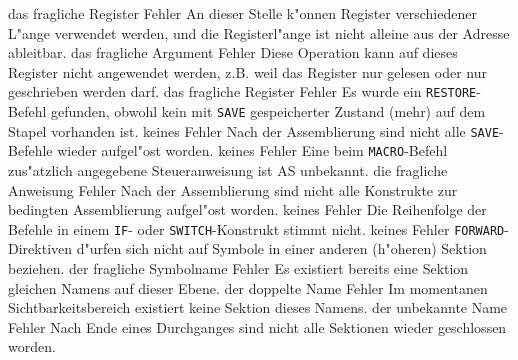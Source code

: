 \documentclass[12pt,a4paper,twoside]{report}
\newcommand{\tty}[1]{{\tt #1}}
\newcommand{\asname}{AS}
\begin{document}
\begin{description}
               {das fragliche Register}
               {Fehler}
               {An dieser Stelle k"onnen Register verschiedener L"ange verwendet werden,
                und die Registerl"ange ist nicht alleine aus der Adresse ableitbar.}
               {das fragliche Argument}
               {Fehler}
               {Diese Operation kann auf dieses Register nicht angewendet werden, z.B.
                weil das Register nur gelesen oder nur geschrieben werden darf.}
               {das fragliche Register}
               {Fehler}
               {Es wurde ein \tty{RESTORE}-Befehl gefunden, obwohl
                kein mit \tty{SAVE} gespeicherter Zustand (mehr) auf dem Stapel
                vorhanden ist.}
               {keines}
               {Fehler}
               {Nach der Assemblierung sind nicht alle
                \tty{SAVE}-Befehle wieder aufgel"ost worden.}
               {keines}
               {Fehler}
               {Eine beim \tty{MACRO}-Befehl zus"atzlich angegebene
                Steueranweisung ist \asname{} unbekannt.}
               {die fragliche Anweisung}
               {Fehler}
               {Nach der Assemblierung sind nicht alle
                Konstrukte zur bedingten Assemblierung aufgel"ost
                worden.}
               {keines}
               {Fehler}
               {Die Reihenfolge der Befehle in einem \tty{IF}-
	        oder \tty{SWITCH}-Konstrukt stimmt nicht.}
               {keines}
               {Fehler}
               {\tty{FORWARD}-Direktiven d"urfen sich nicht auf Symbole in
                einer anderen (h"oheren) Sektion beziehen.}
               {der fragliche Symbolname}
               {Fehler}
               {Es existiert bereits eine Sektion gleichen
                Namens auf dieser Ebene.}
               {der doppelte Name}
               {Fehler}
               {Im momentanen Sichtbarkeitsbereich existiert
                keine Sektion dieses Namens.}
               {der unbekannte Name}
               {Fehler}
               {Nach Ende eines Durchganges sind nicht alle
                Sektionen wieder geschlossen worden.}

\end{description}
\end{document}
